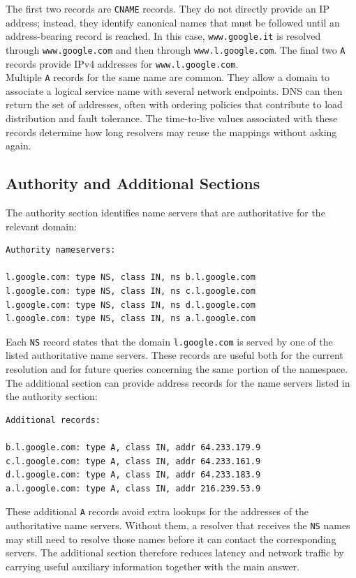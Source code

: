 \documentclass{scrbook}
\begin{document}
	The first two records are \texttt{CNAME} records. They do not directly provide an IP address; instead, they identify canonical names that must be followed until an address-bearing record is reached. In this case, \texttt{www.google.it} is resolved through \texttt{www.google.com} and then through \texttt{www.l.google.com}. The final two \texttt{A} records provide IPv4 addresses for \texttt{www.l.google.com}.\\
	
	Multiple \texttt{A} records for the same name are common. They allow a domain to associate a logical service name with several network endpoints. DNS can then return the set of addresses, often with ordering policies that contribute to load distribution and fault tolerance. The time-to-live values associated with these records determine how long resolvers may reuse the mappings without asking again.
	
	\subsection{Authority and Additional Sections}
	
	The authority section identifies name servers that are authoritative for the relevant domain:
	\begin{lstlisting}
Authority nameservers:

l.google.com: type NS, class IN, ns b.l.google.com
l.google.com: type NS, class IN, ns c.l.google.com
l.google.com: type NS, class IN, ns d.l.google.com
l.google.com: type NS, class IN, ns a.l.google.com
	\end{lstlisting}
	
	Each \texttt{NS} record states that the domain \texttt{l.google.com} is served by one of the listed authoritative name servers. These records are useful both for the current resolution and for future queries concerning the same portion of the namespace.\\
	
	The additional section can provide address records for the name servers listed in the authority section:
	\begin{lstlisting}
Additional records:

b.l.google.com: type A, class IN, addr 64.233.179.9
c.l.google.com: type A, class IN, addr 64.233.161.9
d.l.google.com: type A, class IN, addr 64.233.183.9
a.l.google.com: type A, class IN, addr 216.239.53.9
	\end{lstlisting}
	
	These additional \texttt{A} records avoid extra lookups for the addresses of the authoritative name servers. Without them, a resolver that receives the \texttt{NS} names may still need to resolve those names before it can contact the corresponding servers. The additional section therefore reduces latency and network traffic by carrying useful auxiliary information together with the main answer.
	
\end{document}

